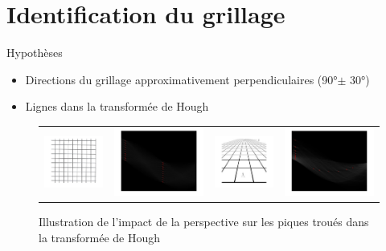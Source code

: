 \documentclass[11pt]{beamer}
\author{Vincent Roulet}
\begin{document}
\begin{frame}
\titlepage
\end{frame}

\section{Identification du grillage}
\begin{frame}{Hypothèses}
\begin{itemize}
	\item Directions du grillage approximativement perpendiculaires (90°$\pm$ 30°)
	\item Lignes dans la transformée de Hough	
\end{itemize}
\begin{figure}[t]
\begin{center}
\begin{tabular}{cccc}
\includegraphics[width = 0.23 \columnwidth]{fig/grillagereduit.png} &
\includegraphics[width = 0.23 \columnwidth]{fig/grillagehough.png}
&
\includegraphics[width = 0.23 \columnwidth]{fig/perspectivereduit.png}
& \includegraphics[width = 0.23 \columnwidth]{fig/perspectivehough.png}
\end{tabular}
\caption{\label{houghlines} Illustration de l'impact de la perspective sur les piques troués dans la transformée de Hough}
\end{center}
\end{figure}
\end{frame}
\end{document}
